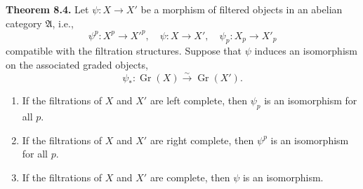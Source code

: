 \textbf{Theorem 8.4.} Let $\psi : X \to X'$ be a morphism of filtered objects in an abelian category $\mathfrak{A}$, i.e.,
$$
\psi^p : X^p \to X'^p, \quad \psi : X \to X', \quad \psi_p : X_p \to X'_p
$$
compatible with the filtration structures. Suppose that $\psi$ induces an isomorphism on the associated graded objects,
$$
\psi_* : \operatorname{Gr}(X) \xrightarrow{\sim} \operatorname{Gr}(X').
$$
\begin{enumerate}
\item If the filtrations of $X$ and $X'$ are left complete, then $\psi_p$ is an isomorphism for all $p$.
\item If the filtrations of $X$ and $X'$ are right complete, then $\psi^p$ is an isomorphism for all $p$.
\item If the filtrations of $X$ and $X'$ are complete, then $\psi$ is an isomorphism.
\end{enumerate}

